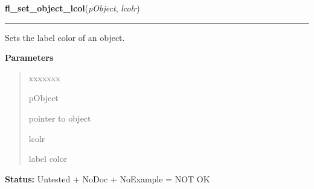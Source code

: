 \hspace{.8\funcindent}\begin{boxedminipage}{\funcwidth}

    \raggedright \textbf{fl\_set\_object\_lcol}(\textit{pObject}, \textit{lcolr})

    \vspace{-1.5ex}

    \rule{\textwidth}{0.5\fboxrule}
\setlength{\parskip}{2ex}
    Sets the label color of an object.

\setlength{\parskip}{1ex}
      \textbf{Parameters}
      \vspace{-1ex}

      \begin{quote}
        \begin{Ventry}{xxxxxxx}

          \item[pObject]

          pointer to object

          \item[lcolr]

          label color

        \end{Ventry}

      \end{quote}

\textbf{Status:} Untested + NoDoc + NoExample = NOT OK



    \end{boxedminipage}

    \label{xformslib:library:fl_set_object_lcol}

    \vspace{0.5ex}

